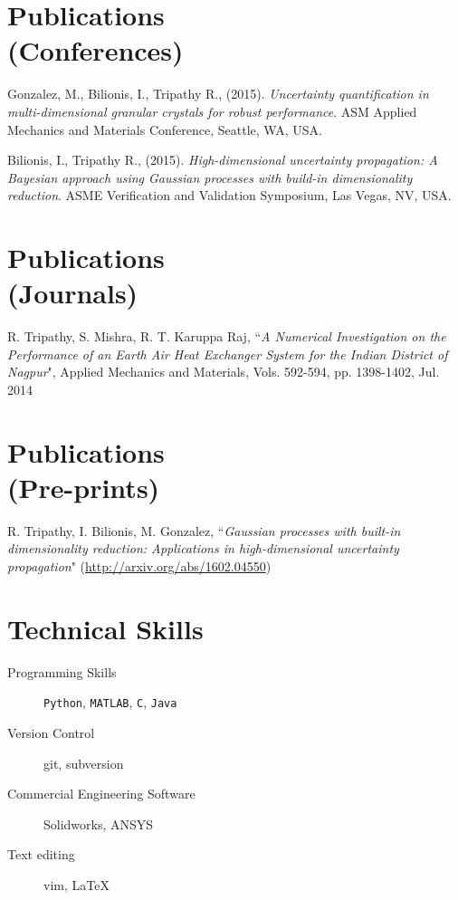 \documentclass[margin,line,a4paper]{resume}
\begin{document}
\begin{resume}
\section{\mysidestyle Publications \\ (Conferences)}
\begin{description}
\item Gonzalez, M., Bilionis, I., Tripathy R., (2015). \textit{Uncertainty quantification in multi-dimensional granular crystals for robust performance}. ASM Applied Mechanics and Materials Conference, Seattle, WA, USA.
\item Bilionis, I., Tripathy R., (2015). \textit{High-dimensional uncertainty propagation: A Bayesian approach using Gaussian processes with build-in dimensionality reduction}. ASME Verification and Validation Symposium, Las Vegas, NV, USA.
\end{description}



\section{\mysidestyle Publications \\ (Journals)}
\begin{description}
\item R. Tripathy, S. Mishra, R. T. Karuppa Raj, ``\textit{A Numerical Investigation on the Performance of an Earth Air Heat Exchanger System for the Indian District of Nagpur}", Applied Mechanics and Materials, Vols. 592-594, pp. 1398-1402, Jul. 2014
\end{description}

\section{\mysidestyle Publications \\ (Pre-prints)}
\begin{description}
\item R. Tripathy, I. Bilionis, M. Gonzalez, ``\textit{Gaussian processes with built-in dimensionality reduction: Applications in high-dimensional uncertainty propagation}"  (\url{http://arxiv.org/abs/1602.04550})
\end{description}




\section{\mysidestyle Technical Skills}
\begin{description}
\item[Programming Skills] \texttt{Python}, \texttt{MATLAB}, \texttt{C}, \texttt{Java}
\item[Version Control] git, subversion 
\item[Commercial Engineering Software] Solidworks, ANSYS
\item[Text editing] vim, \LaTeX
\end{description}




\end{resume}
\end{document}
